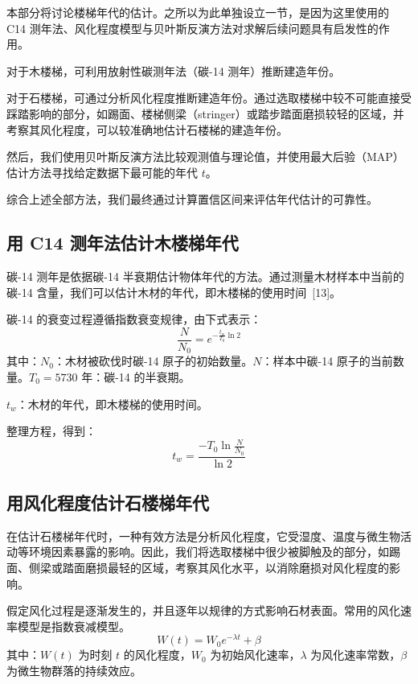 \documentclass[11pt,a4paper]{ctexart}
\begin{document}
本部分将讨论楼梯年代的估计。之所以为此单独设立一节，是因为这里使用的 C14 测年法、风化程度模型与贝叶斯反演方法对求解后续问题具有启发性的作用。

对于木楼梯，可利用放射性碳测年法（碳-14 测年）推断建造年份。

对于石楼梯，可通过分析风化程度推断建造年份。通过选取楼梯中较不可能直接受踩踏影响的部分，如踢面、楼梯侧梁（stringer）或踏步踏面磨损较轻的区域，并考察其风化程度，可以较准确地估计石楼梯的建造年份。

然后，我们使用贝叶斯反演方法比较观测值与理论值，并使用最大后验（MAP）估计方法寻找给定数据下最可能的年代 $t$。

综合上述全部方法，我们最终通过计算置信区间来评估年代估计的可靠性。

\subsection{用 C14 测年法估计木楼梯年代}

碳-14 测年是依据碳-14 半衰期估计物体年代的方法。通过测量木材样本中当前的碳-14 含量，我们可以估计木材的年代，即木楼梯的使用时间\ [13]。

碳-14 的衰变过程遵循指数衰变规律，由下式表示：
\begin{equation}
\frac{N}{N_0}=e^{-\frac{t_w}{T_0}\ln 2} \tag{22}
\end{equation}
其中：$N_0$：木材被砍伐时碳-14 原子的初始数量。$N$：样本中碳-14 原子的当前数量。$T_0=5730$ 年：碳-14 的半衰期。

$t_w$：木材的年代，即木楼梯的使用时间。

整理方程，得到：
\begin{equation}
t_w=\frac{-T_0\ln\frac{N}{N_0}}{\ln 2} \tag{23}
\end{equation}

\subsection{用风化程度估计石楼梯年代}

在估计石楼梯年代时，一种有效方法是分析风化程度，它受湿度、温度与微生物活动等环境因素暴露的影响。因此，我们将选取楼梯中很少被脚触及的部分，如踢面、侧梁或踏面磨损最轻的区域，考察其风化水平，以消除磨损对风化程度的影响。

假定风化过程是逐渐发生的，并且逐年以规律的方式影响石材表面。常用的风化速率模型是指数衰减模型。
\begin{equation}
W(t)=W_0e^{-\lambda t}+\beta \tag{24}
\end{equation}
其中：$W(t)$ 为时刻 $t$ 的风化程度，$W_0$ 为初始风化速率，$\lambda$ 为风化速率常数，$\beta$ 为微生物群落的持续效应。
\end{document}
